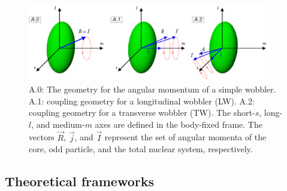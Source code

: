 \documentclass[11pt]{article}
\begin{document}
\begin{figure}
    \centering
    \includegraphics[width=0.95\textwidth]{figs/wobbling_Regimes_COUPLING_SCHEME.pdf}
    \caption{A.0: The geometry for the angular momentum of a simple wobbler. A.1: coupling geometry for a longitudinal wobbler (LW). A.2: coupling geometry for a transverse wobbler (TW). The short-$s$, long-$l$, and medium-$m$ axes are defined in the body-fixed frame. The vectors $\vec{R}$, $\vec{j}$, and $\vec{I}$ represent the set of angular momenta of the core, odd particle, and the total nuclear system, respectively.}
    \label{wobbling-coupling-scheme}
\end{figure}

\subsection{Theoretical frameworks}
\end{document}
